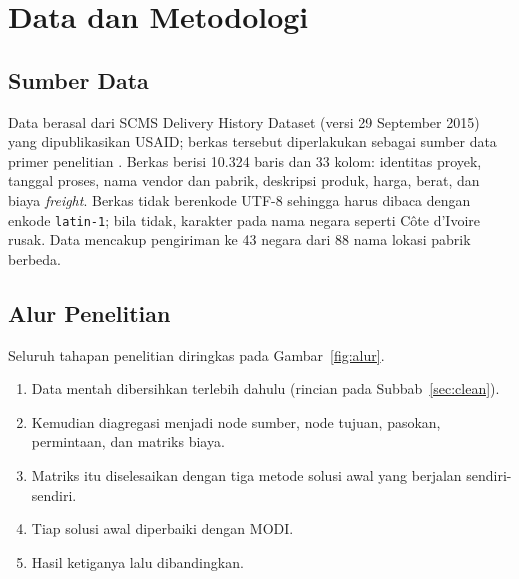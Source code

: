 \documentclass[a4paper,11pt]{article}
\begin{document}
\section{Data dan Metodologi}
\subsection{Sumber Data}
Data berasal dari SCMS Delivery History Dataset (versi 29 September 2015) yang dipublikasikan USAID; berkas tersebut diperlakukan sebagai sumber data primer penelitian \cite{usaid2006}. Berkas berisi 10.324 baris dan 33 kolom: identitas proyek, tanggal proses, nama vendor dan pabrik, deskripsi produk, harga, berat, dan biaya \textit{freight}. Berkas tidak berenkode UTF-8 sehingga harus dibaca dengan enkode \texttt{latin-1}; bila tidak, karakter pada nama negara seperti C\^ote d'Ivoire rusak. Data mencakup pengiriman ke 43 negara dari 88 nama lokasi pabrik berbeda.

\subsection{Alur Penelitian}
Seluruh tahapan penelitian diringkas pada Gambar~\ref{fig:alur}.
\begin{enumerate}
  \item Data mentah dibersihkan terlebih dahulu (rincian pada Subbab~\ref{sec:clean}).
  \item Kemudian diagregasi menjadi node sumber, node tujuan, pasokan, permintaan, dan matriks biaya.
  \item Matriks itu diselesaikan dengan tiga metode solusi awal yang berjalan sendiri-sendiri.
  \item Tiap solusi awal diperbaiki dengan MODI.
  \item Hasil ketiganya lalu dibandingkan.
\end{enumerate}
\end{document}
